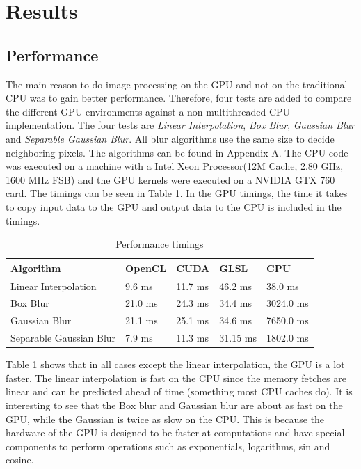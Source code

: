 \section{Results}
\subsection{Performance}

The main reason to do image processing on the GPU and not on the traditional CPU was to gain better performance. Therefore, four tests are added to compare the different GPU environments against a non multithreaded CPU implementation. The four tests are \emph{Linear Interpolation}, \emph{Box Blur}, \emph{Gaussian Blur} and \emph{Separable Gaussian Blur}. All blur algorithms use the same size to decide neighboring pixels. The algorithms can be found in Appendix A. The CPU code was executed on a machine with a Intel Xeon Processor(12M Cache, 2.80 GHz, 1600 MHz FSB) and the GPU kernels were executed on a NVIDIA GTX 760 card. The timings can be seen in Table \ref{tab}. In the GPU timings, the time it takes to copy input data to the GPU and output data to the CPU is included in the timings.

\begin {table}[H]
\caption {Performance timings} \label{tab} 
\begin{center}
    \begin{tabular}{| l | l | l | l | l |}
    \hline
    \textbf{Algorithm} & \textbf{OpenCL} & \textbf{CUDA} & \textbf{GLSL} & \textbf{CPU} \\ \hline
    Linear Interpolation & 9.6 ms & 11.7 ms & 46.2 ms & 38.0 ms \\ \hline
    Box Blur & 21.0 ms & 24.3 ms & 34.4 ms & 3024.0 ms \\ \hline
    Gaussian Blur & 21.1 ms & 25.1 ms & 34.6 ms & 7650.0 ms \\ \hline
    Separable Gaussian Blur & 7.9 ms & 11.3 ms & 31.15 ms & 1802.0 ms \\
    \hline
    \end{tabular}
\end{center}
\end{table}

Table \ref{tab} shows that in all cases except the linear interpolation, the GPU is a lot faster. The linear interpolation is fast on the CPU since the memory fetches are linear and can be predicted ahead of time (something most CPU caches do). It is interesting to see that the Box blur and Gaussian blur are about as fast on the GPU, while the Gaussian is twice as slow on the CPU. This is because the hardware of the GPU is designed to be faster at computations and have special components to perform operations such as exponentials, logarithms, sin and cosine.

